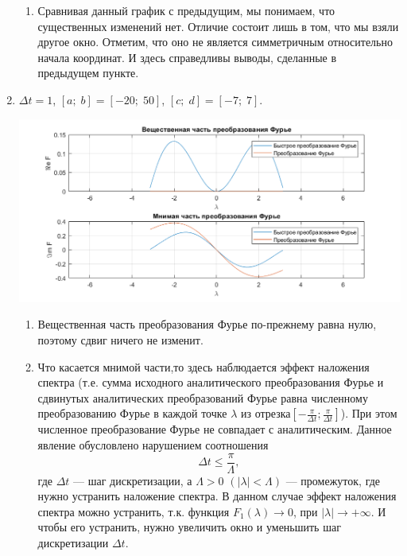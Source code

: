 \documentclass[a4paper, 11pt]{article}
\begin{document}
\begin{enumerate}
                \begin{enumerate}
                    \item
                        Сравнивая данный график с предыдущим, мы понимаем, что существенных изменений нет. Отличие состоит лишь в том, что мы взяли другое окно. Отметим, что оно не является симметричным относительно начала координат. И здесь справедливы выводы, сделанные в предыдущем пункте.
                \end{enumerate}
            
            \item
                $\Delta t = 1$, $[a;\; b] = [-20;\; 50]$, $[c;\;d] = [-7;\;7]$.
                
                \includegraphics[width=\linewidth]{img/6.png}
                
                \begin{enumerate}
                    \item
                        Вещественная часть преобразования Фурье по-прежнему равна нулю, поэтому сдвиг ничего не изменит.
                    \item
                        Что касается мнимой части,то здесь наблюдается эффект наложения спектра (т.е. сумма исходного аналитического преобразования Фурье и сдвинутых аналитических преобразований Фурье равна численному преобразованию Фурье в каждой точке $\lambda$ из отрезка$\left[-\frac{\pi}{\Delta t}; \frac{\pi} {\Delta t} \right]$). При этом численное преобразование Фурье не совпадает с аналитическим. Данное явление обусловлено нарушением соотношения $$\Delta t \leq \frac{\pi} {\Lambda},$$ где $\Delta t$ — шаг дискретизации, а $\Lambda > 0$ $(|\lambda| < \Lambda)$ — промежуток, где нужно устранить наложение спектра. В данном случае эффект наложения спектра можно устранить, т.к. функция $F_1(\lambda) \longrightarrow 0$, при $|\lambda|\longrightarrow +\infty$. И чтобы его устранить, нужно увеличить окно и уменьшить шаг дискретизации $\Delta t$.
                \end{enumerate}
        \end{enumerate}
\end{document}
